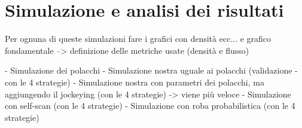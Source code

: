 \chapter{Simulazione e analisi dei risultati}

Per ognuna di queste simulazioni fare i grafici con densità ecc... e grafico fondamentale --> definizione delle metriche usate (densità e flusso)

- Simulazione dei polacchi
- Simulazione nostra uguale ai polacchi (validazione - con le 4 strategie)
- Simulazione nostra con parametri dei polacchi, ma aggiungendo il jockeying (con le 4 strategie) -> viene più veloce
- Simulazione con self-scan (con le 4 strategie)
- Simulazione con roba probabilistica (con le 4 strategie)